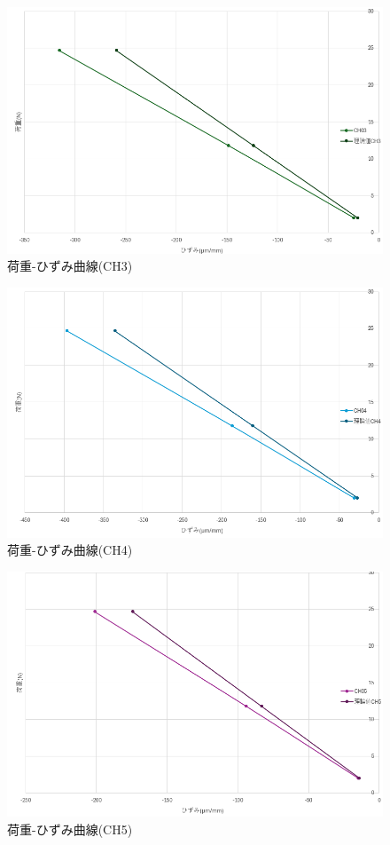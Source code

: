 \documentclass[a4j]{jarticle}
\begin{document}
\begin{figure}[H]
    \centering
    \includegraphics[width=0.8\linewidth]{summer/ship-experiment/bend/picture/ch3.png}
    \caption{荷重-ひずみ曲線(CH3)}
    \label{fig:ch3}
\end{figure}

\begin{figure}[H]
    \centering
    \includegraphics[width=0.8\linewidth]{summer/ship-experiment/bend/picture/ch4.png}
    \caption{荷重-ひずみ曲線(CH4)}
    \label{fig:ch4}
\end{figure}

\begin{figure}[H]
    \centering
    \includegraphics[width=0.8\linewidth]{summer/ship-experiment/bend/picture/ch5.png}
    \caption{荷重-ひずみ曲線(CH5)}
    \label{fig:ch5}
\end{figure}
\end{document}
